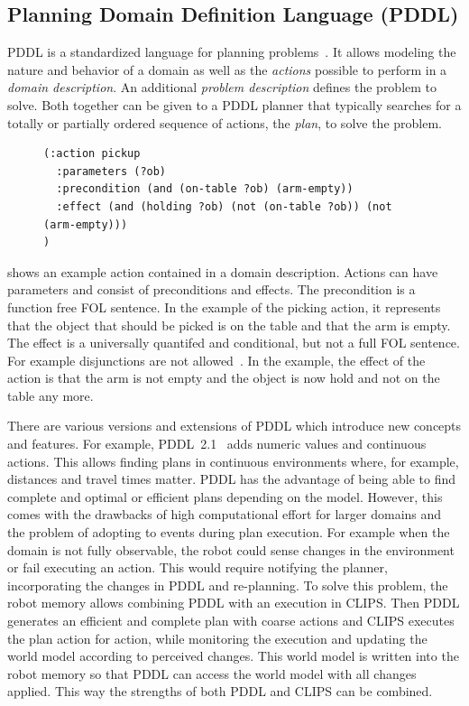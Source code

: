 \subsection{Planning Domain Definition Language (PDDL)}
PDDL is a standardized language for planning
problems~\cite{PDDL}. It allows modeling the nature and behavior of a
domain as well as the \emph{actions} possible to perform in a
\emph{domain description}. An additional \emph{problem description}
defines the problem to solve. Both together can be given to a PDDL
planner that typically searches for a totally or partially ordered
sequence of actions, the \emph{plan}, to solve the problem.
\begin{figure}
\begin{lstlisting}[showlines,style=ReallySmallCLIPS, caption={PDDL
      action to pick up an object from a table},
  label=lsf:pddl-action,
  emph={skill, args, state, target, res},
  emphstyle=\bfseries\color{green!80!black},
  emph={[2]\?skill, \$\?args, wait-for-lock, \?target, use,
  WAIT-FOR-LOCK, SKILL-EXECUTION, running},
  emphstyle={[2]\bfseries\color{blue!80!black}},
  morekeywords={action, parameters, precondition, effect}]
(:action pickup
  :parameters (?ob)
  :precondition (and (on-table ?ob) (arm-empty))
  :effect (and (holding ?ob) (not (on-table ?ob)) (not (arm-empty)))
)
\end{lstlisting}
\end{figure}
 shows an example action contained in a domain
description.  Actions can have parameters and consist of preconditions
and effects. The precondition is a function free FOL sentence. In the
example of the picking action, it represents that the object that
should be picked is on the table and that the arm is empty. The effect
is a universally quantifed and conditional, but not a full FOL
sentence. For example disjunctions are not allowed~\cite{PDDL}. In the
example, the effect of the action is that the arm is not empty and the
object is now hold and not on the table any more.

There are various versions and extensions of PDDL which introduce new
concepts and features. For example, PDDL~2.1~\cite{PDDL2.1} adds
numeric values and continuous actions. This allows finding plans in
continuous environments where, for example, distances and travel times
matter. PDDL has the advantage of being able to find complete and
optimal or efficient plans depending on the model. However, this comes
with the drawbacks of high computational effort for larger domains and
the problem of adopting to events during plan execution. For example
when the domain is not fully observable, the robot could sense changes
in the environment or fail executing an action. This would require
notifying the planner, incorporating the changes in PDDL and
re-planning. To solve this problem, the robot memory allows
combining PDDL with an execution in CLIPS. Then PDDL generates an
efficient and complete plan with coarse actions and CLIPS executes the
plan action for action, while monitoring the execution and updating
the world model according to perceived changes. This world model is
written into the robot memory so that PDDL can access the world model
with all changes applied.  This way the strengths of both PDDL and
CLIPS can be combined.


